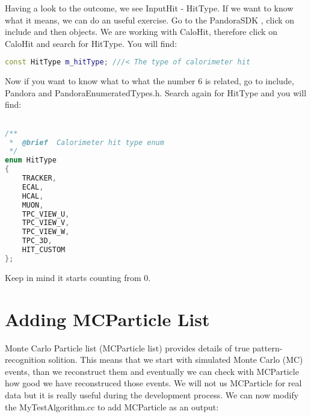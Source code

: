 Having a look to the outcome, we see InputHit - HitType. If we want to know what it means, we can do an useful exercise. Go to the PandoraSDK \cite{pandora_doc}, click on include and then objects. We are working with CaloHit, therefore click on CaloHit and search for HitType. You will find:

\begin{lstlisting}[language=C++]
 const HitType m_hitType; ///< The type of calorimeter hit
\end{lstlisting}

Now if you want to know what to what the number 6 is related, go to include, Pandora and PandoraEnumeratedTypes.h. Search again for HitType and you will find:

\begin{lstlisting}[language=C++]

/**
 *  @brief  Calorimeter hit type enum
 */
enum HitType
{
    TRACKER,
    ECAL,
    HCAL,
    MUON,
    TPC_VIEW_U,
    TPC_VIEW_V,
    TPC_VIEW_W,
    TPC_3D,
    HIT_CUSTOM
};
\end{lstlisting}
Keep in mind it starts counting from 0.

\section{Adding MCParticle List} \label{sssec:mcparticle_list}

Monte Carlo Particle list (MCParticle list) provides details of true pattern-recognition solition. This means that we start with simulated Monte Carlo (MC) events, than we reconstruct them and eventually we can check with MCParticle how good we have reconstruced those events. We will not us MCParticle for real data but it is really useful during the development process. We can now modify the MyTestAlgorithm.cc to add MCParticle as an output:

